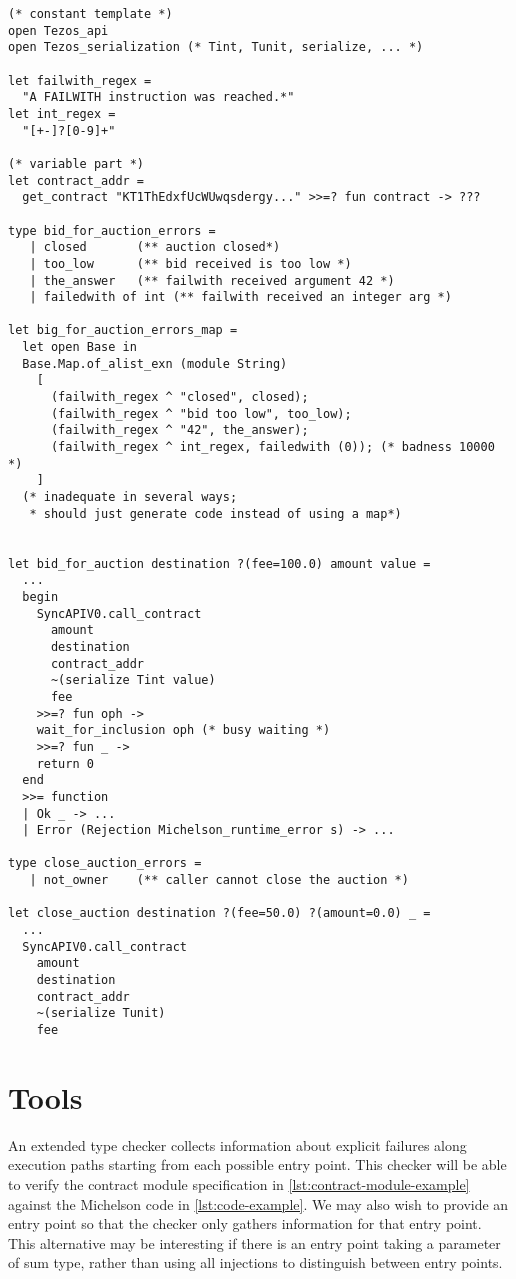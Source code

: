 \documentclass[a4paper]{llncs}
\begin{document}
\begin{lstlisting}[caption={Generated implementation},label={lst:generated-implementation}]
(* constant template *)
open Tezos_api
open Tezos_serialization (* Tint, Tunit, serialize, ... *)

let failwith_regex = 
  "A FAILWITH instruction was reached.*"
let int_regex = 
  "[+-]?[0-9]+"

(* variable part *)
let contract_addr = 
  get_contract "KT1ThEdxfUcWUwqsdergy..." >>=? fun contract -> ???

type bid_for_auction_errors = 
   | closed       (** auction closed*)
   | too_low      (** bid received is too low *)
   | the_answer   (** failwith received argument 42 *)
   | failedwith of int (** failwith received an integer arg *)

let big_for_auction_errors_map =
  let open Base in
  Base.Map.of_alist_exn (module String)
    [
      (failwith_regex ^ "closed", closed);
      (failwith_regex ^ "bid too low", too_low);
      (failwith_regex ^ "42", the_answer);
      (failwith_regex ^ int_regex, failedwith (0)); (* badness 10000 *)
    ]
  (* inadequate in several ways;
   * should just generate code instead of using a map*)
  

let bid_for_auction destination ?(fee=100.0) amount value =
  ...
  begin
    SyncAPIV0.call_contract
      amount
      destination
      contract_addr
      ~(serialize Tint value)
      fee
    >>=? fun oph ->
    wait_for_inclusion oph (* busy waiting *)
    >>=? fun _ ->
    return 0
  end
  >>= function
  | Ok _ -> ...
  | Error (Rejection Michelson_runtime_error s) -> ...

type close_auction_errors = 
   | not_owner    (** caller cannot close the auction *)

let close_auction destination ?(fee=50.0) ?(amount=0.0) _ =
  ...
  SyncAPIV0.call_contract
    amount
    destination
    contract_addr
    ~(serialize Tunit)
    fee
\end{lstlisting}


\clearpage
\section{Tools}
\label{sec:tools}

An extended type checker collects information about explicit failures along execution paths
starting from each possible entry point. This checker will be able to
verify the contract module specification in
\ref{lst:contract-module-example} against the Michelson code in
\ref{lst:code-example}. We may also wish to provide an entry point so
that the checker only gathers information for that entry point. This alternative may be interesting if there
is an entry point taking a parameter of sum type, rather than using all injections to distinguish
between entry points.
\end{document}
